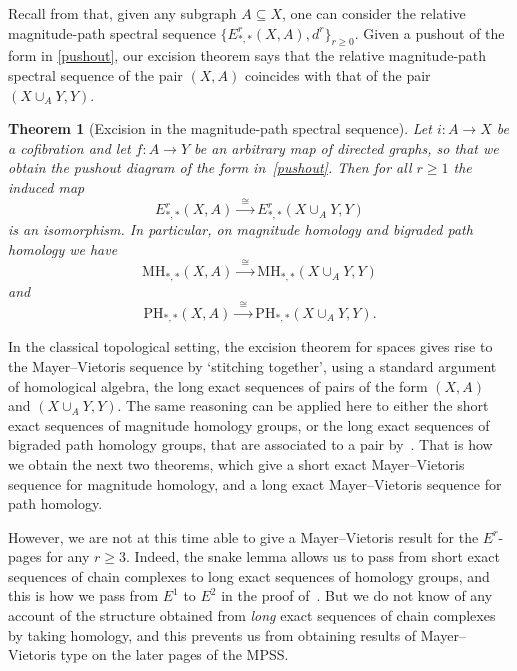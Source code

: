 \documentclass[a4paper, 11 pt, oneside, reqno]{amsart}
\numberwithin{lemma}{section}
\newtheorem{theorem}[lemma]{Theorem}
\theoremstyle{definition}
\newcommand{\MH}{\mathrm{MH}}
\newcommand{\PH}{\mathrm{PH}}
\begin{document}
Recall from  that, given any subgraph \(A \subseteq X\), one can consider the relative magnitude-path spectral sequence \(\{E^r_{\ast,\ast}(X,A), d^r\}_{r \geq 0}\). Given a pushout of the form in \eqref{pushout}, our excision theorem says that the relative magnitude-path spectral sequence of the pair \((X,A)\) coincides with that of the pair \((X \cup_A Y, Y)\).

\begin{theorem}[Excision in the magnitude-path spectral sequence]
\label{excision-all}
    Let $i\colon A\to X$ be a cofibration and let 
    $f\colon A\to Y$ be an arbitrary map of directed graphs,
    so that we obtain the pushout diagram of the form in~\eqref{pushout}.
    Then for all $r\geq 1$ the induced map
    \[
        E^r_{\ast,\ast}(X,A)
        \xrightarrow{\ \ \cong\ \ }
        E^r_{\ast,\ast}(X\cup_A Y,Y)
    \]
    is an isomorphism.
    In particular, on magnitude homology and bigraded path
    homology we have
    \[
        \MH_{\ast,\ast}(X,A)
        \xrightarrow{\ \ \cong\ \ }
        \MH_{\ast,\ast}(X\cup_A Y,Y)
    \]
    and 
    \[
        \PH_{\ast,\ast}(X,A)
        \xrightarrow{\ \ \cong\ \ }
        \PH_{\ast,\ast}(X\cup_A Y,Y).
    \]
\end{theorem}

In the classical topological setting, 
the excision theorem for spaces gives rise to the 
Mayer--Vietoris sequence by `stitching together', 
using a standard argument of homological algebra, 
the long exact sequences
of pairs of the form $(X,A)$ and $(X\cup_A Y,Y)$.
The same reasoning can be applied here 
to either the short exact sequences
of magnitude homology groups, 
or the long exact sequences of bigraded path homology groups,
that are associated to a pair by~.
That is how we obtain the next two theorems, 
which give a short exact Mayer--Vietoris sequence for magnitude homology,
and a long exact Mayer--Vietoris sequence for path homology.

However, we are not at this time able to give a Mayer--Vietoris 
result for the $E^r$-pages for any $r\geq 3$.
Indeed, the snake lemma allows us to 
pass from short exact sequences of chain complexes to
long exact sequences of homology groups,
and this is how we pass from $E^1$ to $E^2$ 
in the proof of~.
But we do not know of any account of the structure obtained
from \emph{long} exact sequences of chain complexes by taking homology,
and this prevents us from obtaining results of Mayer--Vietoris
type on the later pages of the MPSS.
\end{document}
